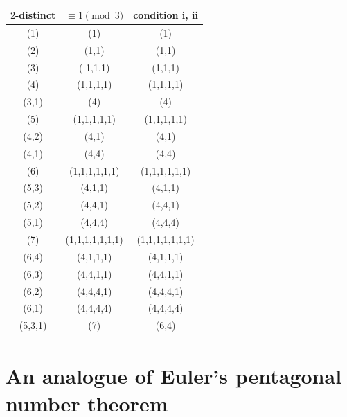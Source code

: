\documentclass[12pt]{amsart}
\numberwithin{equation}{section}
\theoremstyle{plain}
\theoremstyle{definition}
\begin{document}
\begin{table}[htbp]\caption{}
\centering
\begin{tabular}{|c|c|c|}
\hline
$2$-distinct & $\equiv 1 \pmod 3$ & condition i, ii\\
\hline
(1) & (1) & (1)\\
\hline
(2) & (1,1) & (1,1)\\
\hline
(3) &( 1,1,1) & (1,1,1)\\
\hline
(4) & (1,1,1,1) & (1,1,1,1)\\
(3,1) & (4) & (4)\\
\hline
(5) & (1,1,1,1,1) & (1,1,1,1,1)\\
(4,2) & (4,1) & (4,1)\\
(4,1) & (4,4) & (4,4)\\
\hline
(6) & (1,1,1,1,1,1) & (1,1,1,1,1,1)\\
(5,3) & (4,1,1) & (4,1,1)\\
(5,2) & (4,4,1) & (4,4,1)\\
(5,1) & (4,4,4) & (4,4,4)\\
\hline
(7) & (1,1,1,1,1,1,1) & (1,1,1,1,1,1,1)\\
(6,4) & (4,1,1,1) & (4,1,1,1)\\
(6,3) & (4,4,1,1) & (4,4,1,1)\\
(6,2) & (4,4,4,1) & (4,4,4,1)\\
(6,1) & (4,4,4,4) & (4,4,4,4)\\
(5,3,1) & (7) & (6,4)\\
\hline
\end{tabular}
\label{tab4}
\end{table}
































\section{An analogue of Euler's pentagonal number theorem}\label{sec:ana-pent}
\end{document}
